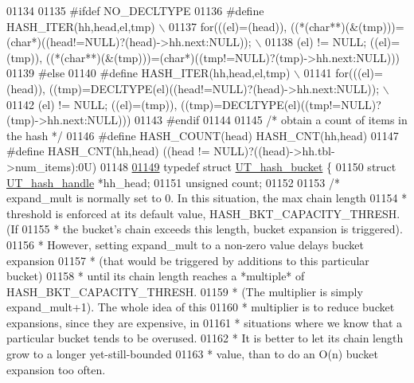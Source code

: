 \begin{DoxyCode}
{{{{{{{{{01134 
01135 \textcolor{preprocessor}{#ifdef NO\_DECLTYPE}
01136 \textcolor{preprocessor}{#define HASH\_ITER(hh,head,el,tmp)                                                \(\backslash\)}
01137 \textcolor{preprocessor}{for(((el)=(head)), ((*(char**)(&(tmp)))=(char*)((head!=NULL)?(head)->hh.next:NULL)); \(\backslash\)}
01138 \textcolor{preprocessor}{  (el) != NULL; ((el)=(tmp)), ((*(char**)(&(tmp)))=(char*)((tmp!=NULL)?(tmp)->hh.next:NULL)))}
01139 \textcolor{preprocessor}{#else}
01140 \textcolor{preprocessor}{#define HASH\_ITER(hh,head,el,tmp)                                                \(\backslash\)}
01141 \textcolor{preprocessor}{for(((el)=(head)), ((tmp)=DECLTYPE(el)((head!=NULL)?(head)->hh.next:NULL));      \(\backslash\)}
01142 \textcolor{preprocessor}{  (el) != NULL; ((el)=(tmp)), ((tmp)=DECLTYPE(el)((tmp!=NULL)?(tmp)->hh.next:NULL)))}
01143 \textcolor{preprocessor}{#endif}
01144 
01145 \textcolor{comment}{/* obtain a count of items in the hash */}
01146 \textcolor{preprocessor}{#define HASH\_COUNT(head) HASH\_CNT(hh,head)}
01147 \textcolor{preprocessor}{#define HASH\_CNT(hh,head) ((head != NULL)?((head)->hh.tbl->num\_items):0U)}
01148 
\mbox{\hyperlink{structUT__hash__bucket}{01149}} \textcolor{keyword}{typedef} \textcolor{keyword}{struct }\mbox{\hyperlink{structUT__hash__bucket}{UT\_hash\_bucket}} \{
01150    \textcolor{keyword}{struct }\mbox{\hyperlink{structUT__hash__handle}{UT\_hash\_handle}} *hh\_head;
01151    \textcolor{keywordtype}{unsigned} count;
01152 
01153    \textcolor{comment}{/* expand\_mult is normally set to 0. In this situation, the max chain length}
01154 \textcolor{comment}{    * threshold is enforced at its default value, HASH\_BKT\_CAPACITY\_THRESH. (If}
01155 \textcolor{comment}{    * the bucket's chain exceeds this length, bucket expansion is triggered).}
01156 \textcolor{comment}{    * However, setting expand\_mult to a non-zero value delays bucket expansion}
01157 \textcolor{comment}{    * (that would be triggered by additions to this particular bucket)}
01158 \textcolor{comment}{    * until its chain length reaches a *multiple* of HASH\_BKT\_CAPACITY\_THRESH.}
01159 \textcolor{comment}{    * (The multiplier is simply expand\_mult+1). The whole idea of this}
01160 \textcolor{comment}{    * multiplier is to reduce bucket expansions, since they are expensive, in}
01161 \textcolor{comment}{    * situations where we know that a particular bucket tends to be overused.}
01162 \textcolor{comment}{    * It is better to let its chain length grow to a longer yet-still-bounded}
01163 \textcolor{comment}{    * value, than to do an O(n) bucket expansion too often.}
}}}}}}}}}
\end{DoxyCode}
